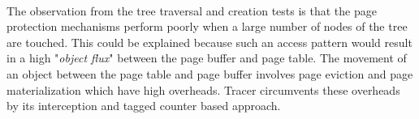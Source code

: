 \paragraph{}
The observation from the tree traversal and creation tests is that the page protection mechanisms perform poorly when a large number of nodes of the tree are touched. This could be explained because such an access pattern would result in a high "{\emph{object flux}}" between the page buffer and page table. The movement of an object between the page table and page buffer involves page eviction and page materialization which have high overheads. Tracer circumvents these overheads by its interception and tagged counter based approach. 
